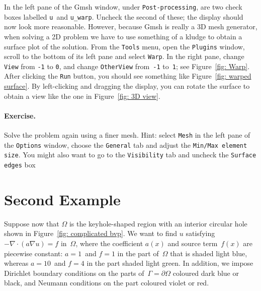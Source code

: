 \documentclass[a4paper,12pt]{article}
\begin{document}
In the left pane of the Gmsh window, under \verb!Post-processing!, 
are two check boxes labelled \verb!u!~and \verb!u_warp!.
Uncheck the second of these; the display should now look more 
reasonable.  However, because Gmsh is really a 3D mesh generator, 
when solving a 2D problem we have to use something 
of a kludge to obtain a surface plot of the solution.  From the 
\verb!Tools! menu, open the \verb!Plugins! window,  
scroll to the bottom of its left pane and select \verb!Warp!.  In the 
right pane, change \verb!View! from \verb!-1! to \verb!0!, and change 
\verb!OtherView! from~\verb!-1! to~\verb!1!; see Figure~\ref{fig: 
Warp}.  After clicking the \verb!Run! button, you should see something 
like Figure~\ref{fig: warped surface}.  By left-clicking and dragging 
the display, you can rotate the surface to obtain a view like the one 
in Figure~\ref{fig: 3D view}.

\paragraph{Exercise.} 
Solve the problem again using a finer mesh.  Hint: select \verb!Mesh! 
in the left pane of the \verb!Options! window, choose the 
\verb!General! tab and adjust the \verb!Min/Max element size!.  You 
might also want to go to the \verb!Visibility! tab and
uncheck the \verb!Surface edges! box 
\section*{Second Example}
Suppose now that $\Omega$ is the keyhole-shaped region with an 
interior circular hole shown in Figure~\ref{fig: complicated bvp}.
We want to find $u$ satisfying $-\nabla\cdot(a\nabla u)=f$ 
in~$\Omega$, where the coefficient $a(x)$ and source term~$f(x)$ are 
piecewise constant: $a=1$~and $f=1$ in the part of~$\Omega$ that is 
shaded light blue, whereas $a=10$~and $f=4$ in the part shaded 
light green. In addition, we impose Dirichlet boundary conditions on 
the parts of~$\Gamma=\partial\Omega$ coloured dark blue or black, and 
Neumann conditions on the part coloured violet or red.
\end{document}
